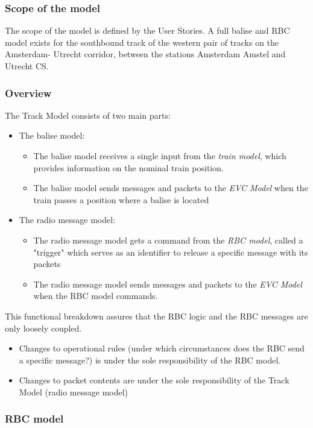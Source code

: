 \documentclass{template/openetcs_article}
\begin{document}
\subsubsection{Scope of the model}

The scope of the model is defined by the User Stories. A full balise and RBC model exists for the southbound track of the western pair of tracks on the Amsterdam- Utrecht corridor, between the stations Amsterdam Amstel and Utrecht CS.

\subsubsection{Overview}

The Track Model consists of two main parts:
\begin{itemize}
 \item The balise model:
  \begin{itemize} 
   \item The balise model receives a single input from the \emph{train model}, which provides information on the nominal train position.
   \item The balise model sends messages and packets to the \emph{EVC Model} when the train passes a position where a balise is located
  \end{itemize}
 \item The radio message model:
  \begin{itemize}
   \item The radio message model gets a command from the \emph{RBC model}, called a "trigger" which serves as an identifier to release a specific message with its packets
   \item The radio message model sends messages and packets  to the \emph{EVC Model} when the RBC model commands.
  \end{itemize}
\end{itemize}

This functional breakdown assures that the RBC logic and the RBC messages are only loosely coupled. 
\begin{itemize}
 \item Changes to operational rules (under which circumstances does the RBC send a specific message?) is under the sole responsibility of the RBC model. 
 \item Changes to packet contents are under the sole responsibility of the Track Model (radio message model)
\end{itemize}
\subsubsection{RBC model}
\end{document}
